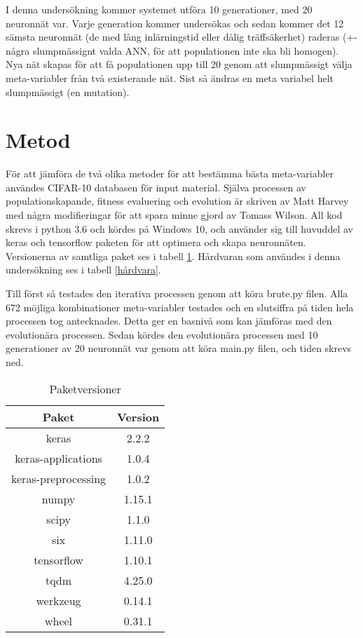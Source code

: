 \documentclass[a4paper, 12pt]{article}
\begin{document}
    I denna undersökning kommer systemet utföra 10 generationer, med 20 neuronnät var. Varje generation kommer undersökas och sedan kommer det 12 sämsta neuronnät (de med lång inlärningstid eller dålig träffsäkerhet) raderas (+- några slumpmässignt valda ANN, för att populationen inte ska bli homogen). Nya nät skapas för att få populationen upp till 20 genom att slumpmässigt välja meta-variabler från två existerande nät. Sist så ändras en meta variabel helt slumpmässigt (en mutation).

\newpage

  \section{Metod}
  För att jämföra de två olika metoder för att bestämma bästa meta-variabler användes CIFAR-10 databasen för input material. Själva processen av populationskapande, fitness evaluering och evolution är skriven av Matt Harvey \parencite{harvey2017} med några modifieringar för att spara minne gjord av Tomass Wilson. All kod skrevs i python 3.6 och kördes på Windows 10, och använder sig till huvuddel av keras och tensorflow paketen för att optimera och skapa neuronnäten. Versionerna av samtliga paket ses i tabell \ref{paketversioner}. Hårdvaran som användes i denna undersökning ses i tabell \ref{hårdvara}.

  Till först så testades den iterativa processen genom att köra brute.py filen. Alla 672 möjliga kombinationer meta-variabler testades och en slutsiffra på tiden hela processen tog antecknades. Detta ger en basnivå som kan jämföras med den evolutionära processen. Sedan kördes den evolutionära processen med 10 generationer av 20 neuronnät var genom att köra main.py filen, och tiden skrevs ned.

\begin{table}[H]
    \centering
    \begin{tabular}{c|c}
      Paket & Version \\
      \hline
      keras & 2.2.2 \\
      keras-applications & 1.0.4 \\
      keras-preprocessing & 1.0.2 \\
      numpy & 1.15.1 \\
      scipy & 1.1.0 \\
      six & 1.11.0 \\
      tensorflow & 1.10.1 \\
      tqdm & 4.25.0 \\
      werkzeug & 0.14.1 \\
      wheel & 0.31.1
    \end{tabular}
    \caption{Paketversioner}
    \label{paketversioner}
\end{table}
\end{document}
